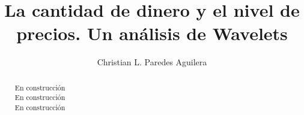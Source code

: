 \documentclass[a4paper,fleqn]{cas-sc}
\begin{document}
\let\WriteBookmarks\relax
\def\floatpagepagefraction{1}
\def\textpagefraction{.001}

\shorttitle{}    


\title[mode = title]{La cantidad de dinero y el nivel de precios. Un análisis de Wavelets}  

\tnotemark[1]



\author[1]{Christian L. Paredes Aguilera}%









\begin{abstract}
En construcción\\
En construcción\\
En construcción\\\\
\end{abstract}

\end{document}

